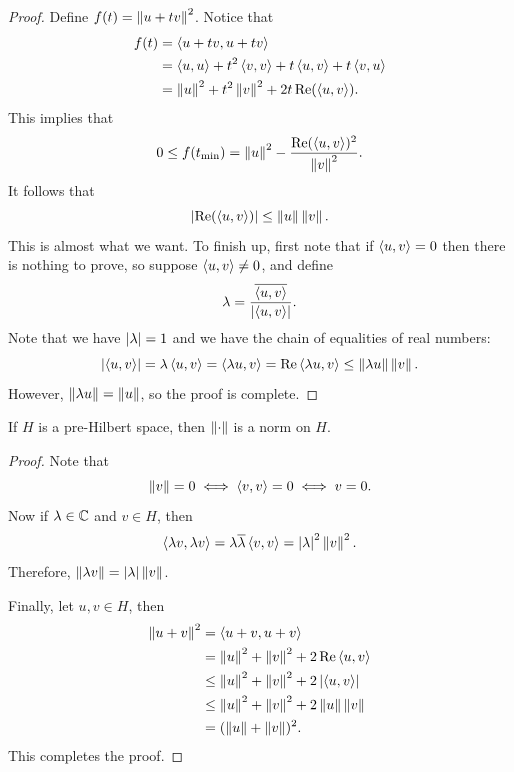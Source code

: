 \documentclass[a4paper]{article}
\begin{document}
\begin{proof}
Define $f(t) = \norm{u + tv}^2$. Notice that 
\[
\begin{aligned}
  f(t) 
  &= \braket{u + tv}{u + tv}  \\
  &= \braket{u}{u} 
  + t^2 \braket{v}{v} + t \braket{u}{v} + t \braket{v}{u} \\
  &= \norm{u}^2 + t^2 \norm{v}^2 + 2t \Re(\braket{u}{v}).
\end{aligned}
\]  
This implies that 
\[
0 \leq f(t_{\text{min}}) = \norm{u}^2 - 
\frac{\Re(\braket{u}{v})^2}{\norm{v}^2}.
\]
It follows that 
\[
\abs{\Re( \braket{u}{v} )} \leq \norm{u} \norm{v}.
\]
This is almost what we want. 
To finish up, first note that if 
$\braket{u}{v} = 0$ then there is nothing to prove,
so suppose $\braket{u}{v} \neq 0$,
and define 
\[
\lambda = \frac{\bar{\braket{u}{v}}}{\abs{\braket{u}{v}}}.
\]
Note that we have $\abs{\lambda} = 1$ and we have 
the chain of equalities of real numbers:
\[
\abs{\braket{u}{v}} = \lambda \braket{u}{v} 
= \braket{\lambda u}{v} = \Re \braket{\lambda u}{v} 
\leq \norm{\lambda u} \norm{v}.
\]
However, $\norm{\lambda u} = \norm{u}$, so the proof is 
complete.

\end{proof}

\begin{thm}
If $H$ is a pre-Hilbert space, then $\norm{\cdot}$ 
is a norm on $H$.
\end{thm}

\begin{proof}
  Note that 
  \[
  \norm{v} = 0 \iff \braket{v}{v} = 0 \iff v = 0.
  \]
  Now if $\lambda \in \C$ and $v \in H$, then 
  \[
  \braket{\lambda v}{\lambda v} = \lambda \bar{\lambda}
  \braket{v}{v} = \abs{\lambda}^2 \norm{v}^2.
  \]
  Therefore, $\norm{\lambda v} = \abs{\lambda} \norm{v}$. 
  
  Finally, let $u, v \in H$, then 
  \[
  \begin{aligned}
    \norm{u + v}^2 
    &= \braket{u + v}{u + v} \\
    &= \norm{u}^2 + \norm{v}^2 + 2 \Re \braket{u}{v} \\
    &\leq \norm{u}^2 + \norm{v}^2 + 2 \abs{\braket{u}{v}} \\
    &\leq \norm{u}^2 + \norm{v}^2 + 2 \norm{u} \norm{v} \\
    &= (\norm{u} + \norm{v})^2.
  \end{aligned}
  \]
  This completes the proof.
\end{proof}
\end{document}
